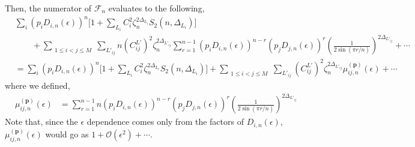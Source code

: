 \documentclass[11pt]{article}
\newcommand{\ep}{\epsilon}
\newcommand{\mO}{\mathcal{O}}
\newcommand{\nn}{\nonumber}
\newcommand{\lb}{\left(}
\newcommand{\rb}{\right)}
\begin{document}
Then, the numerator of $\mathcal{F}_n$ evaluates to the following,
\begin{align}
    &\sum_i  \lb p_iD_{i,n}(\ep)\rb^n \big[  1+ \sum_{L_i}C_i^2 \zeta_n^{2\Delta_{L_i}}S_2(n,\Delta_{L_i})\big] \nn \\&\qquad + \displaystyle\sum_{\substack{1\leq i<j\leq M}}\sum_{L'_{ij}}n\lb C_{ij}^{L'}\rb^2 \zeta_n^{2\Delta_{L'_{ij}}}\sum_{r=1}^{n-1} \lb p_iD_{i,n}(\ep)\rb ^{n-r}\lb p_j D_{j,n}(\ep)\rb ^r \lb\frac{1}{2\sin (\pi r/n)}\rb^{2\Delta_{L'_{ij}}} + \cdots \\
    &=\sum_i  \lb p_iD_{i,n}(\ep)\rb^n \big[  1+ \sum_{L_i}C_i^2 \zeta_n^{2\Delta_{L_i}} S_2(n,\Delta_{L_i})\big] + \displaystyle\sum_{\substack{1\leq i<j\leq M}}\sum_{L'_{ij}}\lb C_{ij}^{L'}\rb^2 \zeta_n^{2\Delta_{L'_{ij}}} \mu_{ij,n}^{(\textbf{p})}(\ep) + \cdots 
\end{align}
where we defined,
\begin{align}    
    \mu_{ij,n}^{(\textbf{p})}(\ep) &= \sum_{r=1}^{n-1} n\lb p_iD_{i,n}(\ep)\rb ^{n-r}\lb p_j D_{j,n}(\ep)\rb ^r  \lb\frac{1}{2\sin (\pi r/n)}\rb^{2\Delta_{L'_{ij}}} 
\end{align}
Note that, since the $\ep$ dependence comes only from the factors of $D_{i,n}(\ep)$, $\mu_{ij,n}^{(\textbf{p})}(\ep)$ would go as $1+ \mO(\ep^2) + \cdots$. 
\end{document}
